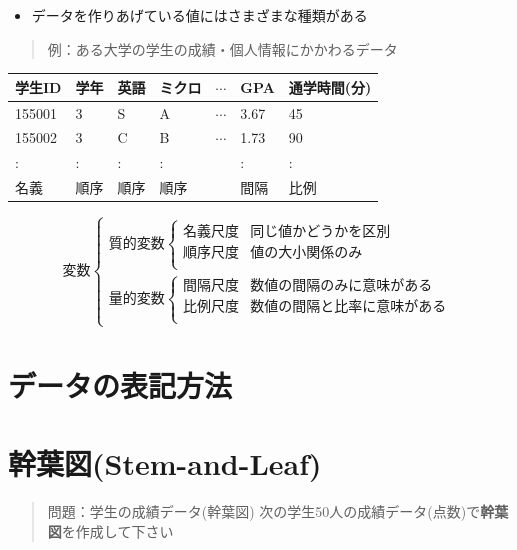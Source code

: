\documentclass[
]{book}
\providecommand{\tightlist}{%
  \setlength{\itemsep}{0pt}\setlength{\parskip}{0pt}}
\theoremstyle{definition}
\theoremstyle{definition}
\theoremstyle{definition}
\theoremstyle{definition}
\theoremstyle{remark}
\begin{document}
\begin{itemize}
\tightlist
\item
  データを作りあげている値にはさまざまな種類がある
\end{itemize}

\begin{quote}
例：ある大学の学生の成績・個人情報にかかわるデータ
\end{quote}

\begin{longtable}[]{@{}lllllll@{}}
\toprule()
学生ID & 学年 & 英語 & ミクロ & \(\cdots\) & GPA & 通学時間(分) \\
\midrule()
\endhead
155001 & 3 & S & A & \(\cdots\) & 3.67 & 45 \\
155002 & 3 & C & B & \(\cdots\) & 1.73 & 90 \\
: & : & : & : & & : & : \\
名義 & 順序 & 順序 & 順序 & & 間隔 & 比例 \\
\bottomrule()
\end{longtable}

\[
\text{変数}
\begin{cases}
\text{質的変数}
\begin{cases}
\text{名義尺度} & \text{同じ値かどうかを区別} \\
\text{順序尺度} & \text{値の大小関係のみ} \\
\end{cases} \\
\text{量的変数}
\begin{cases}
\text{間隔尺度} & \text{数値の間隔のみに意味がある} \\
\text{比例尺度} & \text{数値の間隔と比率に意味がある} \\
\end{cases}
\end{cases}
\]

\hypertarget{ux30c7ux30fcux30bfux306eux8868ux8a18ux65b9ux6cd5}{%
\section{データの表記方法}\label{ux30c7ux30fcux30bfux306eux8868ux8a18ux65b9ux6cd5}}

\hypertarget{ux5e79ux8449ux56f3stem-and-leaf}{%
\section{幹葉図(Stem-and-Leaf)}\label{ux5e79ux8449ux56f3stem-and-leaf}}

\begin{quote}
問題：学生の成績データ(幹葉図)
次の学生50人の成績データ(点数)で\textbf{幹葉図}を作成して下さい
\end{quote}
\end{document}
